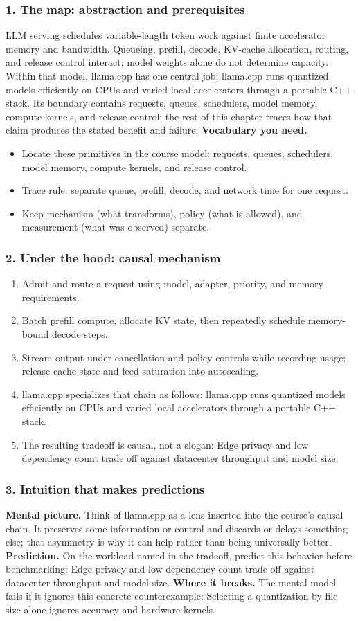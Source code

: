 \subsubsection*{1. The map: abstraction and prerequisites}
LLM serving schedules variable-length token work against finite accelerator memory and bandwidth. Queueing, prefill, decode, KV-cache allocation, routing, and release control interact; model weights alone do not determine capacity.
Within that model, llama.cpp has one central job: llama.cpp runs quantized models efficiently on CPUs and varied local accelerators through a portable C++ stack. Its boundary contains requests, queues, schedulers, model memory, compute kernels, and release control; the rest of this chapter traces how that claim produces the stated benefit and failure.
\textbf{Vocabulary you need.}\begin{itemize}
\item Locate these primitives in the course model: requests, queues, schedulers, model memory, compute kernels, and release control.
\item Trace rule: separate queue, prefill, decode, and network time for one request.
\item Keep mechanism (what transforms), policy (what is allowed), and measurement (what was observed) separate.
\end{itemize}
\subsubsection*{2. Under the hood: causal mechanism}\begin{enumerate}
\item Admit and route a request using model, adapter, priority, and memory requirements.
\item Batch prefill compute, allocate KV state, then repeatedly schedule memory-bound decode steps.
\item Stream output under cancellation and policy controls while recording usage; release cache state and feed saturation into autoscaling.
\item llama.cpp specializes that chain as follows: llama.cpp runs quantized models efficiently on CPUs and varied local accelerators through a portable C++ stack.
\item The resulting tradeoff is causal, not a slogan: Edge privacy and low dependency count trade off against datacenter throughput and model size.
\end{enumerate}
\subsubsection*{3. Intuition that makes predictions}
\textbf{Mental picture.} Think of llama.cpp as a lens inserted into the course's causal chain. It preserves some information or control and discards or delays something else; that asymmetry is why it can help rather than being universally better.
\textbf{Prediction.} On the workload named in the tradeoff, predict this behavior before benchmarking: Edge privacy and low dependency count trade off against datacenter throughput and model size.
\textbf{Where it breaks.} The mental model fails if it ignores this concrete counterexample: Selecting a quantization by file size alone ignores accuracy and hardware kernels.
